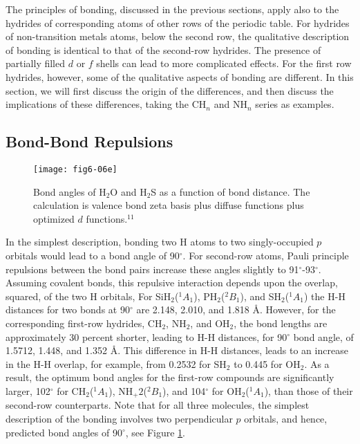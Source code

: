 The principles of bonding, discussed in the previous sections, apply 
also to the hydrides of corresponding atoms of other rows of the 
periodic table.  For hydrides of non-transition metals atoms, below 
the second row, the qualitative description of bonding is identical to 
that of the second-row hydrides.  The presence of partially filled $d$ 
or $f$ shells can lead to more complicated effects.  For the first row 
hydrides, however, some of the qualitative aspects of bonding are 
different.  In this section, we will first discuss the origin of the 
differences, and then discuss the implications of these differences, 
taking the CH$_n$ and NH$_n$ series as examples.

\subsection{Bond-Bond Repulsions}

\begin{figure}
\texttt{[image: fig6-06e]}
\caption{Bond angles of H$_2$O and H$_2$S as a function 
of bond distance.  The calculation is valence bond zeta basis plus
diffuse functions plus optimized $d$ functions.$^{11}$ }
\label{chap6-fig7}
\end{figure}

In the simplest description, bonding two H atoms to two
singly-occupied $p$ orbitals would lead to a bond angle of
90$^{\circ}$.  For second-row atoms, Pauli principle repulsions
between the bond pairs increase these angles slightly to
91$^{\circ}$-93$^{\circ}$.  Assuming covalent bonds, this repulsive
interaction depends upon the overlap, squared, of the two H orbitals,
For SiH$_2$(${^1A}_1$), PH$_2$(${^2B}_1$), and SH$_2$(${^1A}_1$) the
H-H distances for two bonds at 90$^{\circ}$ are 2.148, 2.010, and
1.818 \AA.  However, for the corresponding first-row hydrides, CH$_2$,
NH$_2$, and OH$_2$, the bond lengths are approximately 30 percent
shorter, leading to H-H distances, for 90$^{\circ}$ bond angle, of
1.5712, 1.448, and 1.352 \AA.  This difference in H-H distances, leads
to an increase in the H-H overlap, for example, from 0.2532 for SH$_2$
to 0.445 for OH$_2$.  As a result, the optimum bond angles for the
first-row compounds are significantly larger, 102$^{\circ}$ for
CH$_2$(${^1A}_1$), NH$_+2$(${^2B}_1$), and 104$^{\circ}$ for
OH$_2$(${^1A}_1$), than those of their second-row counterparts.  Note
that for all three molecules, the simplest description of the bonding
involves two perpendicular $p$ orbitals, and hence, predicted bond
angles of 90$^{\circ}$, see Figure \ref{chap6-fig7}.

